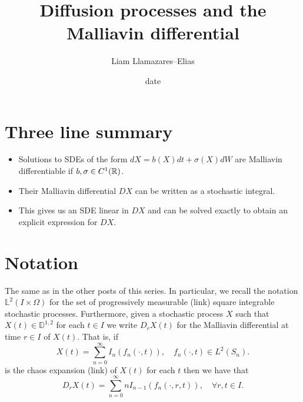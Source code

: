 \documentclass[12pt]{article}
\begin{document}
\title{Diffusion processes and the Malliavin differential}
\author{Liam Llamazares--Elias}
\date{date}
\maketitle
\section{ Three line summary}
\begin{itemize}
	\item Solutions to SDEs of the form $dX=b(X) d t +\sigma (X)dW $ are Malliavin differentiable if $b,\sigma \in C^1({\mathbb R})$.
	\item Their Malliavin differential $DX$ can be written as a stochastic integral.
	\item This gives us an SDE linear in $DX$ and can be solved exactly to obtain an explicit expression for  $DX$.
\end{itemize}
\section{Notation}
The same as in the other posts of this series. In particular, we recall the notation $\mathbb{L}^2(I\times\Omega)$ for the set of progressively measurable (link) square integrable stochastic processes. Furthermore, given a stochastic process $X$ such that  $X(t)\in \mathbb{D}^{1,2}$ for each $t\in I$ we write $D_rX(t)$ for the Malliavin differential at  time $r\in I$ of $X(t)$. That is, if
\begin{equation}\label{ce}
	X(t)=\sum_{n=0}^{\infty}  I_n(f_n(\cdot ,t)),\quad f_n(\cdot ,t)\in L^2(S_n).
\end{equation}
is the chaos expansion (link) of $X(t)$ for each  $t$ then we have that
\begin{equation}\label{ced}
	D_rX(t)=\sum_{n=0}^{\infty}  nI_{n-1}(f_n(\cdot ,r,t)) , \quad\forall r,t\in I.
\end{equation}
\end{document}

